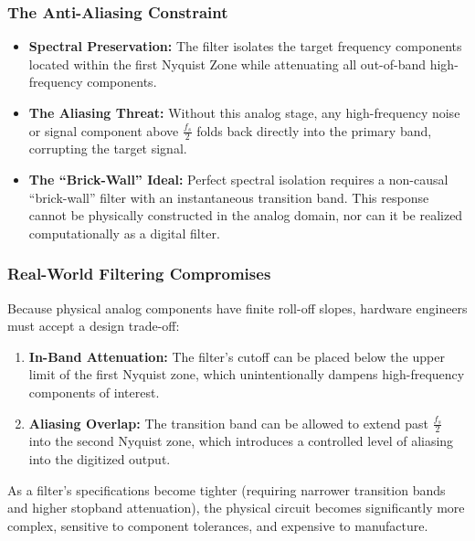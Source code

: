 \documentclass[
]{article}
\providecommand{\tightlist}{%
  \setlength{\itemsep}{0pt}\setlength{\parskip}{0pt}}
\begin{document}
\subsubsection{The Anti-Aliasing
Constraint}\label{the-anti-aliasing-constraint}

\begin{itemize}
\tightlist
\item
  \textbf{Spectral Preservation:} The filter isolates the target
  frequency components located within the first Nyquist Zone while
  attenuating all out-of-band high-frequency components.
\item
  \textbf{The Aliasing Threat:} Without this analog stage, any
  high-frequency noise or signal component above \(\frac{f_s}{2}\) folds
  back directly into the primary band, corrupting the target signal.
\item
  \textbf{The ``Brick-Wall'' Ideal:} Perfect spectral isolation requires
  a non-causal ``brick-wall'' filter with an instantaneous transition
  band. This response cannot be physically constructed in the analog
  domain, nor can it be realized computationally as a digital filter.
\end{itemize}

\subsubsection{Real-World Filtering
Compromises}\label{real-world-filtering-compromises}

Because physical analog components have finite roll-off slopes, hardware
engineers must accept a design trade-off:

\begin{enumerate}
\def\labelenumi{\arabic{enumi}.}
\tightlist
\item
  \textbf{In-Band Attenuation:} The filter's cutoff can be placed below
  the upper limit of the first Nyquist zone, which unintentionally
  dampens high-frequency components of interest.
\item
  \textbf{Aliasing Overlap:} The transition band can be allowed to
  extend past \(\frac{f_s}{2}\) into the second Nyquist zone, which
  introduces a controlled level of aliasing into the digitized output.
\end{enumerate}

As a filter's specifications become tighter (requiring narrower
transition bands and higher stopband attenuation), the physical circuit
becomes significantly more complex, sensitive to component tolerances,
and expensive to manufacture.
\end{document}
